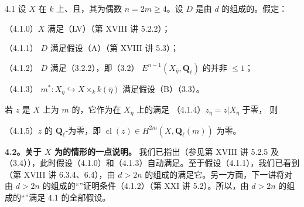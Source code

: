 \begin{SGAresult}{}{4.1}
设 $X$ 在 $k$ 上、且，其为偶数 $n=2m\geq4$。设 $D$ 是由 $d$ 的组成的。假定：

\noindent（4.1.0）$X$ 满足（LV）（第 XVIII 讲 5.2.2）；

\noindent（4.1.1） $D$ 满足假设（A）（第 XVIII 讲 5.3）；

\noindent（4.1.2） $D$ 满足（3.2.2），即（3.2） $E^{n-1}(X_{\bar\eta},\mathbf Q_\ell)$ 的并非 $\leq1$；

\noindent（4.1.3） $m^*:X_{\bar\eta}\hookrightarrow X\times_k k(\bar\eta)$ 满足假设（B）（3.3）。

若 $z$ 是 $X$ 上为 $m$ 的，它作为在 $X_{\bar\eta}$ 上的满足
\noindent（4.1.4）$z_{\bar\eta}=z|X_{\bar\eta}$ 于零，
则

\noindent（4.1.5）$z$ 的 $\mathbf Q_\ell$-为零，即 $\operatorname{cl}(z)\in H^{2m}(X,\mathbf Q_\ell(m))$ 为零。
\end{SGAresult}
\textbf{4.2。关于 $X$ 为的情形的一点说明。}
我们已指出（参见第 XVIII 讲 5.2.5 及（3.4）），此时假设（4.1.0）和（4.1.3）自动满足。至于假设（4.1.1），我们已看到（第 XVIII 讲 6.3.4、6.4），由 $d>2n$ 的组成的满足它。另一方面，下一讲将对由 $d>2n$ 的组成的“”证明条件（4.1.2）（第 XXI 讲 5.2）。所以，由 $d>2n$ 的组成的“”满足 4.1 的全部假设。

